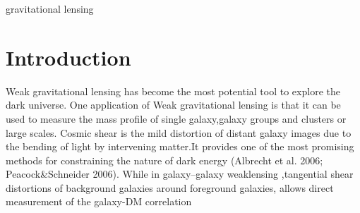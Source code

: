 \documentclass[useAMS,usenatbib]{mn2e}
\begin{document}
\begin{keywords}
  gravitational lensing
\end{keywords}

\setcounter{footnote}{1}




\section{Introduction}

\label{sec:intro}










Weak gravitational lensing has become the most potential tool to explore
the dark universe. One application of Weak gravitational lensing is
that it can be used to measure the mass profile of single galaxy,galaxy
groups and clusters or large scales. Cosmic shear is the mild distortion
of distant galaxy images due to the bending of light by intervening
matter.It provides one of the most promising methods for constraining
the nature of dark energy (Albrecht et al. 2006; Peacock\&Schneider
2006). While in galaxy--galaxy weaklensing ,tangential shear distortions
of background galaxies around foreground galaxies, allows direct measurement
of the galaxy-DM correlation
\end{document}
